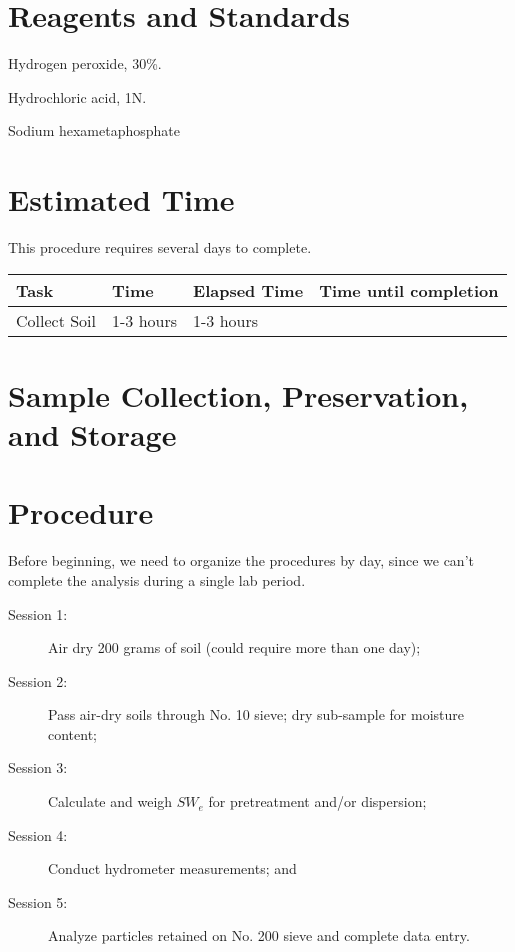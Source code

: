 \documentclass[12pt]{../SOP3_alpha}
\begin{document}
\section{Reagents and Standards}

\begin{enumerate*}
	\item Hydrogen peroxide, 30\%.
	\item Hydrochloric acid, 1N.
	\item Sodium hexametaphosphate
\end{enumerate*}

\section{Estimated Time}

\NP This procedure requires several days to complete.

\begin{table}
\begin{tabular}{llll}\hline
Task          & Time          & Elapsed Time  & Time until completion \\ \hline\hline
Collect Soil  & 1-3 hours     & 1-3 hours     &         \\ \hline
\end{tabular}
\end{table}

\section{Sample Collection, Preservation, and Storage}



\section{Procedure}

\NP Before beginning, we need to organize the procedures by day, since we can't complete the analysis during a single lab period.

\begin{description}
	\item[Session 1:] Air dry 200 grams of soil (could require more than one day);
	\item[Session 2:] Pass air-dry soils through No. 10 sieve; dry sub-sample for moisture content; 
	\item[Session 3:] Calculate and weigh $SW_e$ for pretreatment and/or dispersion; 
	\item[Session 4:] Conduct hydrometer measurements; and
	\item[Session 5:] Analyze particles retained on No. 200 sieve and complete data entry.
\end{description}
\end{document}
